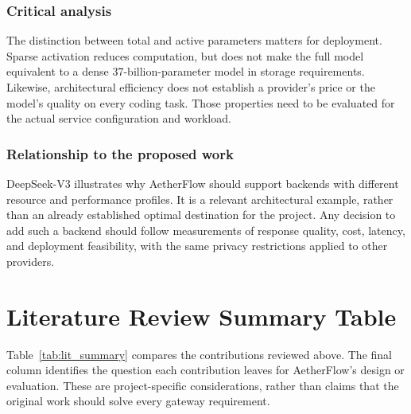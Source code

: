 \subsubsection{Critical analysis}
The distinction between total and active parameters matters for deployment. Sparse activation reduces computation, but does not make the full model equivalent to a dense 37-billion-parameter model in storage requirements. Likewise, architectural efficiency does not establish a provider's price or the model's quality on every coding task. Those properties need to be evaluated for the actual service configuration and workload.

\subsubsection{Relationship to the proposed work}
DeepSeek-V3 illustrates why AetherFlow should support backends with different resource and performance profiles. It is a relevant architectural example, rather than an already established optimal destination for the project. Any decision to add such a backend should follow measurements of response quality, cost, latency, and deployment feasibility, with the same privacy restrictions applied to other providers.

\section{Literature Review Summary Table}

Table~\ref{tab:lit_summary} compares the contributions reviewed above. The final column identifies the question each contribution leaves for AetherFlow's design or evaluation. These are project-specific considerations, rather than claims that the original work should solve every gateway requirement.

